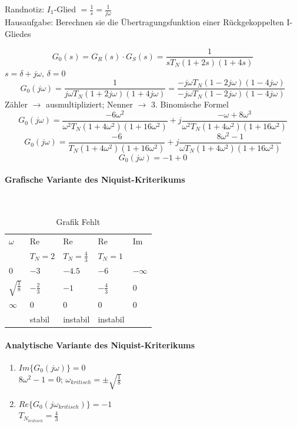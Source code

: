 \documentclass{article}
\begin{document}
Randnotiz: $I_1$-Glied $=\frac{1}{s} = \frac{1}{j\omega}$ \\
Hausaufgabe: Berechnen sie die Übertragungsfunktion einer Rückgekoppelten I-Gliedes

\vspace{1em}
\begin{center}
	\[ G_0(s) = G_R(s) \cdot G_S(s) = \frac{1}{sT_N (1+2s) (1+4s)} \]
	$ s = \delta + j\omega$, $ \delta = 0 $
	\[ G_0(j\omega) = \frac{1}{j\omega T_N (1+2j\omega)(1+4j\omega)} = \frac{-j\omega T_N (1-2j\omega)(1-4j\omega)}{-j\omega T_N (1-2j\omega)(1-4j\omega)} \]
	Zähler $\to$ ausmultipliziert; Nenner $\to$ 3. Binomische Formel
	\[ G_0(j\omega) = \frac{-6\omega^2}{\omega^2 T_N (1+4\omega^2)(1+16\omega^2)} + j \frac{-\omega + 8\omega^3}{\omega^2 T_N (1+4\omega^2)(1+16\omega^2)} \]
	\[ G_0(j\omega) = \frac{-6}{T_N (1+4\omega^2)(1+16\omega^2)} + j \frac{8\omega^2 -1}{\omega T_N (1+4\omega^2)(1+16\omega^2)} \]
	\[ G_0(j\omega) = -1 + 0\]
\end{center}

\paragraph{Grafische Variante des Niquist-Kriterikums} \mbox{} \\
\begin{table}[h]
	\centering
	\begin{tabular}{|l||l|l|l|l|}
	\hline
	$\omega$ 				& Re 				& Re 					& Re 				& Im 		\\
							& $T_N=2$			& $T_N = \frac{4}{3}$	& $T_N = 1$			&			\\
	\hline\hline
	0						& $-3$ 				& $-4.5$				& $-6$				& $-\infty$ \\
	\hline
	$\sqrt{\frac{1}{8}}$ 	& $-\frac{2}{3}$ 	& $-1$ 					& $-\frac{4}{3}$	& 0			\\
	\hline
	$\infty$ 				& 0					& 0						& 0					& 0			\\
	\hline
							& stabil			& instabil				& instabil			&			\\
	\hline
	\end{tabular}
	\caption{Grafik Fehlt}
\end{table}

\paragraph{Analytische Variante des Niquist-Kriterikums}
\begin{enumerate}
	\item $Im\{ G_0(j\omega)\} = 0$ \\
	$8 \omega^2-1=0$; $\omega_{kritisch} = \pm \sqrt{\frac{1}{8}}$
	\item $Re \{ G_0(j\omega_{kritisch}) \} = -1$ \\
	$T_{N_{kritisch}} = \frac{4}{3}$
\end{enumerate}
\end{document}
